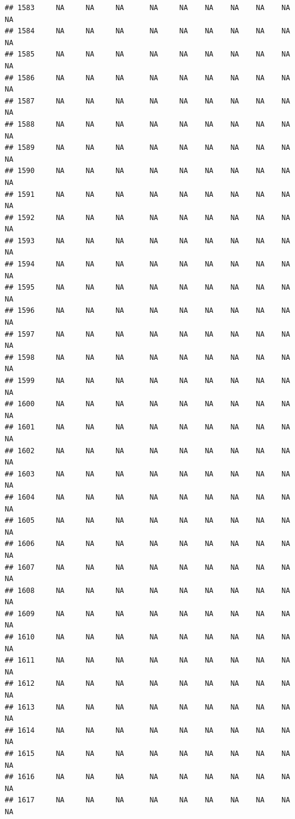 \documentclass{article}\usepackage{graphicx, color}
\makeatletter
\newenvironment{kframe}{%
 \def\at@end@of@kframe{}%
 \ifinner\ifhmode%
  \def\at@end@of@kframe{\end{minipage}}%
  \begin{minipage}{\columnwidth}%
 \fi\fi%
 \def\FrameCommand##1{\hskip\@totalleftmargin \hskip-\fboxsep
 \colorbox{shadecolor}{##1}\hskip-\fboxsep
     \hskip-\linewidth \hskip-\@totalleftmargin \hskip\columnwidth}%
 \MakeFramed {\advance\hsize-\width
   \@totalleftmargin\z@ \linewidth\hsize
   \@setminipage}}%
 {\par\unskip\endMakeFramed%
 \at@end@of@kframe}
\newenvironment{knitrout}{}{} %
\makeatother
\begin{document}
\begin{knitrout}
\begin{kframe}
\begin{verbatim}
## 1583     NA     NA     NA      NA     NA    NA    NA    NA    NA     NA
## 1584     NA     NA     NA      NA     NA    NA    NA    NA    NA     NA
## 1585     NA     NA     NA      NA     NA    NA    NA    NA    NA     NA
## 1586     NA     NA     NA      NA     NA    NA    NA    NA    NA     NA
## 1587     NA     NA     NA      NA     NA    NA    NA    NA    NA     NA
## 1588     NA     NA     NA      NA     NA    NA    NA    NA    NA     NA
## 1589     NA     NA     NA      NA     NA    NA    NA    NA    NA     NA
## 1590     NA     NA     NA      NA     NA    NA    NA    NA    NA     NA
## 1591     NA     NA     NA      NA     NA    NA    NA    NA    NA     NA
## 1592     NA     NA     NA      NA     NA    NA    NA    NA    NA     NA
## 1593     NA     NA     NA      NA     NA    NA    NA    NA    NA     NA
## 1594     NA     NA     NA      NA     NA    NA    NA    NA    NA     NA
## 1595     NA     NA     NA      NA     NA    NA    NA    NA    NA     NA
## 1596     NA     NA     NA      NA     NA    NA    NA    NA    NA     NA
## 1597     NA     NA     NA      NA     NA    NA    NA    NA    NA     NA
## 1598     NA     NA     NA      NA     NA    NA    NA    NA    NA     NA
## 1599     NA     NA     NA      NA     NA    NA    NA    NA    NA     NA
## 1600     NA     NA     NA      NA     NA    NA    NA    NA    NA     NA
## 1601     NA     NA     NA      NA     NA    NA    NA    NA    NA     NA
## 1602     NA     NA     NA      NA     NA    NA    NA    NA    NA     NA
## 1603     NA     NA     NA      NA     NA    NA    NA    NA    NA     NA
## 1604     NA     NA     NA      NA     NA    NA    NA    NA    NA     NA
## 1605     NA     NA     NA      NA     NA    NA    NA    NA    NA     NA
## 1606     NA     NA     NA      NA     NA    NA    NA    NA    NA     NA
## 1607     NA     NA     NA      NA     NA    NA    NA    NA    NA     NA
## 1608     NA     NA     NA      NA     NA    NA    NA    NA    NA     NA
## 1609     NA     NA     NA      NA     NA    NA    NA    NA    NA     NA
## 1610     NA     NA     NA      NA     NA    NA    NA    NA    NA     NA
## 1611     NA     NA     NA      NA     NA    NA    NA    NA    NA     NA
## 1612     NA     NA     NA      NA     NA    NA    NA    NA    NA     NA
## 1613     NA     NA     NA      NA     NA    NA    NA    NA    NA     NA
## 1614     NA     NA     NA      NA     NA    NA    NA    NA    NA     NA
## 1615     NA     NA     NA      NA     NA    NA    NA    NA    NA     NA
## 1616     NA     NA     NA      NA     NA    NA    NA    NA    NA     NA
## 1617     NA     NA     NA      NA     NA    NA    NA    NA    NA     NA

\end{verbatim}
\end{kframe}
\end{knitrout}
\end{document}

